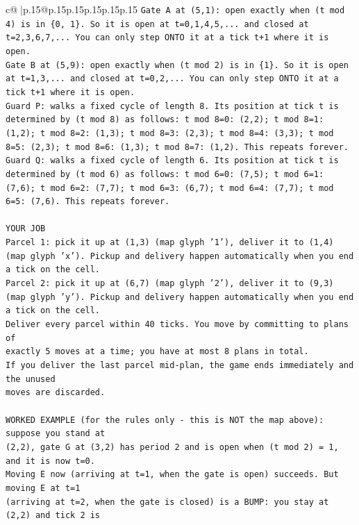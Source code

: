 \documentclass{article}
\begin{document}
{\begin{supertabular}{c@{$\;$}|p{.15\linewidth}@{}p{.15\linewidth}p{.15\linewidth}p{.15\linewidth}p{.15\linewidth}p{.15\linewidth}}
{{{\texttt{Gate A at (5,1): open exactly when (t mod 4) is in \{0, 1\}. So it is open at t=0,1,4,5,... and closed at t=2,3,6,7,... You can only step ONTO it at a tick t+1 where it is open.} \\
\texttt{Gate B at (5,9): open exactly when (t mod 2) is in \{1\}. So it is open at t=1,3,... and closed at t=0,2,... You can only step ONTO it at a tick t+1 where it is open.} \\
\texttt{Guard P: walks a fixed cycle of length 8. Its position at tick t is determined by (t mod 8) as follows: t mod 8=0: (2,2); t mod 8=1: (1,2); t mod 8=2: (1,3); t mod 8=3: (2,3); t mod 8=4: (3,3); t mod 8=5: (2,3); t mod 8=6: (1,3); t mod 8=7: (1,2). This repeats forever.} \\
\texttt{Guard Q: walks a fixed cycle of length 6. Its position at tick t is determined by (t mod 6) as follows: t mod 6=0: (7,5); t mod 6=1: (7,6); t mod 6=2: (7,7); t mod 6=3: (6,7); t mod 6=4: (7,7); t mod 6=5: (7,6). This repeats forever.} \\
\\ 
\texttt{YOUR JOB} \\
\texttt{Parcel 1: pick it up at (1,3) (map glyph '1'), deliver it to (1,4) (map glyph 'x'). Pickup and delivery happen automatically when you end a tick on the cell.} \\
\texttt{Parcel 2: pick it up at (6,7) (map glyph '2'), deliver it to (9,3) (map glyph 'y'). Pickup and delivery happen automatically when you end a tick on the cell.} \\
\texttt{Deliver every parcel within 40 ticks. You move by committing to plans of} \\
\texttt{exactly 5 moves at a time; you have at most 8 plans in total.} \\
\texttt{If you deliver the last parcel mid{-}plan, the game ends immediately and the unused} \\
\texttt{moves are discarded.} \\
\\ 
\texttt{WORKED EXAMPLE (for the rules only {-} this is NOT the map above): suppose you stand at} \\
\texttt{(2,2), gate G at (3,2) has period 2 and is open when (t mod 2) = 1, and it is now t=0.} \\
\texttt{Moving E now (arriving at t=1, when the gate is open) succeeds. But moving E at t=1} \\
\texttt{(arriving at t=2, when the gate is closed) is a BUMP: you stay at (2,2) and tick 2 is} \\
}}}
\end{supertabular}}
\end{document}
